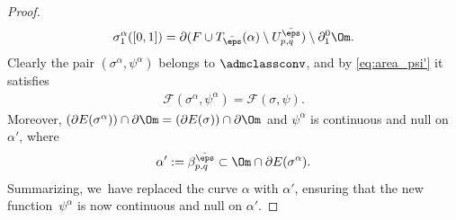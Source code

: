 \begin{proof}
\begin{equation*}
\sigma^\alpha_{1}([0,1])= \partial (F\cup T_{\bar\eps}(\alpha)\setminus U^{\bar{\eps}}_{p,q})\setminus\partial_1^0\Om.
\end{equation*}
Clearly the pair $(\sigma^\alpha,\psi^\alpha)$ belongs to $\admclassconv$, and by \eqref{eq:area_psi'} it satisfies
\begin{equation*}
\begin{split}
{\mathcal F}(\sigma^\alpha,\psi^\alpha)=
{\mathcal F}(\sigma, \psi).
\end{split}
\end{equation*}
Moreover,
$
(\partial E(\sigma^\alpha))\cap\partial\Om=(\partial E(\sigma))\cap\partial\Om$ and $\psi^\alpha$ is continuous and null on $\alpha'$, where
\begin{equation}\label{gamma'}
\alpha':=\beta_{p,q}^{\bar\eps}\subset \Om\cap\partial E(\sigma^\alpha).
\end{equation}
Summarizing, we~have replaced the curve $\alpha$ with $\alpha'$, ensuring that the new function~$\psi^\alpha$ is now continuous and null on $\alpha'$.


\end{proof}
